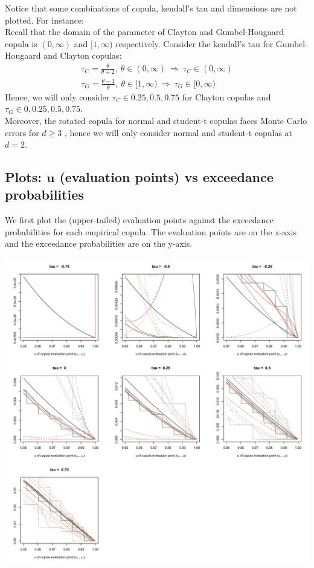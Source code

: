 \documentclass[12pt]{report}
\newcommand{\1}{\mathbf{1}}
\begin{document}
\begin{flushleft}
Notice that some combinations of copula, kendall's tau and dimensions are not plotted. For instance:\\
\vspace{0.5cm}
Recall that the domain of the parameter of Clayton and Gumbel-Hougaard copula is $(0,\infty)$ and $[1,\infty)$ respectively. Consider the kendall's tau for Gumbel-Hougaard and Clayton copulas:
\begin{align*}
    \tau_{C} = \frac{\theta}{\theta + 2}, \: \theta \in (0,\infty) \: \Longrightarrow \: \tau_{C} \in (0,\infty) \\
    \tau_{G} = \frac{\theta - 1}{\theta}, \: \theta \in [1,\infty) \: \Longrightarrow \: \tau_{G} \in [0,\infty) 
\end{align*}
Hence, we will only consider $\tau_{C} \in {0.25, 0.5, 0.75}$ for Clayton copulas and $\tau_{G} \in {0, 0.25, 0.5, 0.75}$.\\
\vspace{0.5cm}
Moreover, the rotated copula for normal and student-t copulas faces Monte Carlo errors for $d \ge 3$ \parencite{HofertBook}, hence we will only consider normal and student-t copulas at $d = 2$.
\newpage
\subsection{Plots: $\textbf{u}$ (evaluation points) vs exceedance probabilities}
\vspace{0.5cm}
We first plot the (upper-tailed) evaluation points against the exceedance probabilities for each empirical copula. The evaluation points are on the x-axis and the exceedance probabilities are on the y-axis.

\begin{center}
\label{t4_2d_s}
\includegraphics[width=17cm]{ExceedanceProb/t4_2d_s.png}
\end{center}%


\end{flushleft}
\end{document}
